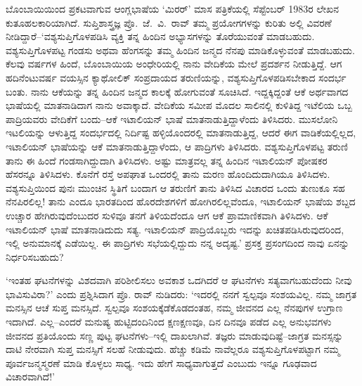 ಬೊಂಬಾಯಿಯಿಂದ ಪ್ರಕಟವಾಗುವ ಆಂಗ್ಲಭಾಷೆಯ ‘ಮಿರರ್​’ ಮಾಸ ಪತ್ರಿಕೆಯಲ್ಲಿ ಸೆಪ್ಟೆಂಬರ್ 1983ರ ಲೇಖನ ಕುತೂಹಲಕಾರಿಯಾಗಿದೆ. ಸುಪ್ತಿಶಾಸ್ತ್ರಜ್ಞ ಪ್ರೊ.\ ಜೆ.\ ವಿ.\ ರಾವ್ ತಮ್ಮ ಪ್ರಯೋಗಗಳನ್ನು ಕುರಿತು ಅಲ್ಲಿ ವಿವರಣೆ ನೀಡಿದ್ದಾರೆ–‘ವಶ್ಯಸುಪ್ತಿಗೊಳಪಡಿಸಿ ವ್ಯಕ್ತಿ ತನ್ನ ಹಿಂದಿನ ಅಭ್ಯಾಸಗಳನ್ನು ತೊರೆಯುವಂತೆ ಮಾಡಬಹುದು. ವಶ್ಯಸುಪ್ತಿಗೊಳಪಟ್ಟ ಗಂಡಸು ಅಥವಾ ಹೆಂಗಸನ್ನು ತಮ್ಮ ಹಿಂದಿನ ಜನ್ಮದ ನೆನಪು ಮಾಡಿಕೊಳ್ಳುವಂತೆ ಮಾಡಬಹುದು. ಕೆಲವು ವರ್ಷಗಳ ಹಿಂದೆ, ಬೊಂಬಾಯಿಯ ಅಂಧೇರಿಯಲ್ಲಿ ನಾನು ವೇದಿಕೆಯ ಮೇಲೆ ಪ್ರದರ್ಶನ ನೀಡುತ್ತಿದ್ದೆ. ಆಗ ಹದಿನೆಂಟುವರ್ಷ ವಯಸ್ಸಿನ ಕ್ಯಾಥೋಲಿಕ್ ಸಂಪ್ರದಾಯದ ತರುಣಿಯನ್ನು, ವಶ್ಯಸುಪ್ತಿ\-ಗೊಳಪಡಿಸ\-ಬೇಕಾದ ಸಂದರ್ಭ ಬಂತು. ನಾನು ಆಕೆಯನ್ನು ತನ್ನ ಹಿಂದಿನ ಜನ್ಮದ ಕಾಲಕ್ಕೆ ಹೋಗುವಂತೆ ಸೂಚಿಸಿದೆ. ಇದ್ದಕ್ಕಿದ್ದಂತೆ ಆಕೆ ಅರ್ಥವಾಗದ ಭಾಷೆಯಲ್ಲಿ ಮಾತನಾಡಿದಾಗ ನಾನು ಅವಾಕ್ಕಾದೆ. ವೇದಿಕೆಯ ಸಮೀಪ ಮೊದಲ ಸಾಲಿನಲ್ಲಿ ಕುಳಿತಿದ್ದ ಇಟೆಲಿಯ ಒಬ್ಬ ಪಾದ್ರಿಯವರು ವೇದಿಕೆಗೆ ಬಂದು–ಆಕೆ ಇಟಾಲಿಯನ್ ಭಾಷೆ ಮಾತನಾಡುತ್ತಿದ್ದಾಳೆಂದು ತಿಳಿಸಿದರು. ಮುಸಲೋನಿ ಇಟಲಿಯನ್ನು ಆಳುತ್ತಿದ್ದ ಸಂದರ್ಭದಲ್ಲಿ ನಿರ್ದಿಷ್ಟ ಹಳ್ಳಿಯೊಂದರಲ್ಲಿ ಮಾತನಾಡುತ್ತಿದ್ದ, ಆದರೆ ಈಗ ವಾಡಿಕೆಯಲ್ಲಿಲ್ಲದ, ಇಟಾಲಿಯನ್ ಭಾಷೆಯನ್ನು ಆಕೆ ಮಾತನಾಡುತ್ತಿದ್ದಾಳೆಂದು, ಆ ಪಾದ್ರಿಗಳು ತಿಳಿಸಿದರು. ವಶ್ಯಸುಪ್ತಿಗೊಳಪಟ್ಟ ತರುಣಿ ತಾನು ಈ ಹಿಂದೆ ಗಂಡಸಾಗಿದ್ದುದಾಗಿ ತಿಳಿಸಿದಳು. ಅಷ್ಟು ಮಾತ್ರವಲ್ಲ ತನ್ನ ಹಿಂದಿನ ಇಟಾಲಿಯನ್ ಪೋಷಕರ ಹೆಸರನ್ನೂ ತಿಳಿಸಿದಳು. ಕೊನೆಗೆ ರಸ್ತೆ ಅಪಘಾತ ಒಂದರಲ್ಲಿ ತಾನು ಮರಣ ಹೊಂದಿದುದಾಗಿಯೂ ತಿಳಿಸಿದಳು. ವಶ್ಯಸುಪ್ತಿಯಿಂದ ಪುನಃ ಮುಂಚಿನ ಸ್ಥಿತಿಗೆ ಬಂದಾಗ ಆ ತರುಣಿಗೆ ತಾನು ತಿಳಿಸಿದ ವಿಚಾರದ ಒಂದು ತುಣುಕೂ ಸಹ ನೆನಪಿರಲಿಲ್ಲ! ತಾನು ಎಂದೂ ಭಾರತದಿಂದ ಹೊರದೇಶಗಳಿಗೆ ಹೋಗಿರಲಿಲ್ಲವೆಂದೂ, ಇಟಾಲಿಯನ್ ಭಾಷೆಯ ಶಬ್ದದ ಉಚ್ಚಾರ ಹೇಗಿರುವುದೆಂಬುದರ ಸುಳಿವೂ ತನಗೆ ತಿಳಿಯದೆಂದೂ ಆಗ ಆಕೆ ಪ್ರಾಮಾಣಿಕವಾಗಿ ತಿಳಿಸಿದಳು. ಆಕೆ ಇಟಾಲಿಯನ್ ಭಾಷೆ ಮಾತನಾಡಿದುದು ಸತ್ಯ. ಇಟಾಲಿಯನ್ ಪಾದ್ರಿಯೊಬ್ಬರು ಇದನ್ನು ಖಚಿತಪಡಿಸಿರುವುದರಿಂದ, ಇಲ್ಲಿ ಅನುಮಾನಕ್ಕೆ ಎಡೆಯಿಲ್ಲ. ಈ ಪಾದ್ರಿಗಳು ಸಭೆಯಲ್ಲಿದ್ದುದು ನನ್ನ ಅದೃಷ್ಟ.’ ಪ್ರಸಕ್ತ ಪ್ರಸಂಗದಿಂದ ನಾವು ಏನನ್ನು ನಿರ್ಧರಿಸಬಹುದು?

‘ಇಂತಹ ಘಟನೆಗಳನ್ನು ವಿಶದವಾಗಿ ಪರಿಶೀಲಿಸಲು ಅವಕಾಶ ಒದಗಿದರೆ ಆ ಘಟನೆಗಳು ಸತ್ಯವಾಗಬಹುದೆಂದು ನೀವು ಭಾವಿಸುವಿರಾ?’ ಎಂದು ಪ್ರಶ್ನಿಸಿದಾಗ ಪ್ರೊ. ರಾವ್ ನುಡಿದರು: ‘ಇದರಲ್ಲಿ ನನಗೆ ಸ್ವಲ್ಪವೂ ಸಂಶಯವಿಲ್ಲ. ನಮ್ಮ ಜಾಗ್ರತ ಮನಸ್ಸಿನ ಆಚೆ ಸುಪ್ತ ಮನಸ್ಸಿದೆ. ಸ್ವಲ್ಪವೂ ಸಂಶಯಕ್ಕೆಡೆಕೊಡದಂತಹ, ನಮ್ಮ ಜೀವನದ ಎಲ್ಲ ನೆನಪುಗಳ ಉಗ್ರಾಣ ಇದಾಗಿದೆ. ಎಲ್ಲ–ಎಂದರೆ ಮನುಷ್ಯ ಹುಟ್ಟಿದಂದಿನಿಂದ ಕ್ಷಣಕ್ಷಣವೂ, ದಿನ ದಿನವೂ ಪಡೆದ ಎಲ್ಲ ಅನುಭವಗಳು ಜೀವನದ ಪ್ರತಿಯೊಂದು ಸಣ್ಣ ಪುಟ್ಟ ಘಟನೆಗಳು–ಇಲ್ಲಿ ದಾಖಲಾಗಿವೆ. ತಜ್ಞರು ಮಾಡುವುದಿಷ್ಟೆ–ಜಾಗ್ರತ ಮನಸ್ಸನ್ನು ದಾಟಿ ನೇರವಾಗಿ ಸುಪ್ತ ಮನಸ್ಸಿಗೆ ಸಲಹೆ ನೀಡುವುದು. ಹೆಚ್ಚು ಕಡಿಮೆ ನಾವೆಲ್ಲರೂ ವಶ್ಯಸುಪ್ತಿಗೊಳಪಟ್ಟಾಗ ನಮ್ಮ ಪೂರ್ವಜನ್ಮಸ್ಮರಣೆ ಮಾಡಿ ಕೊಳ್ಳಲು ಸಾಧ್ಯ. ಇದು ಹೇಗೆ ಸಾಧ್ಯವಾಗುತ್ತದೆ ಎಂಬುದು ಇನ್ನೂ ಗೂಢವಾದ ವಿಚಾರವಾಗಿದೆ!’

